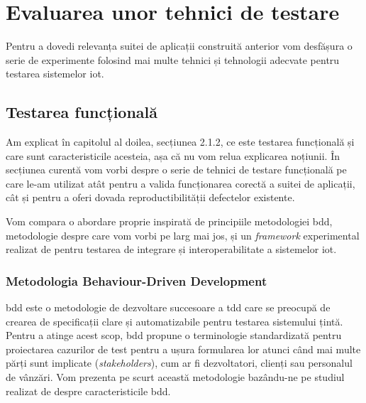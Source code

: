 \chapter{Evaluarea unor tehnici de testare}

Pentru a dovedi relevanța suitei de aplicații construită anterior vom desfășura o serie de experimente folosind mai multe tehnici și tehnologii adecvate pentru testarea sistemelor \acrshort{iot}. 



\section{Testarea funcțională}

Am explicat în capitolul al doilea, secțiunea 2.1.2, ce este testarea funcțională și care sunt caracteristicile acesteia, așa că nu vom relua explicarea noțiunii. În secțiunea curentă vom vorbi despre o serie de tehnici de testare funcțională pe care le-am utilizat atât pentru a valida funcționarea corectă a suitei de aplicații, cât și pentru a oferi dovada reproductibilității defectelor existente.

Vom compara o abordare proprie inspirată de principiile metodologiei \acrfull{bdd}, metodologie despre care vom vorbi pe larg mai jos, și un \textit{framework} experimental realizat de \cite{Bures2021} pentru testarea de integrare și interoperabilitate a sistemelor \acrshort{iot}.

\subsection{Metodologia Behaviour-Driven Development}


\acrfull{bdd} este o metodologie de dezvoltare succesoare a \acrfull{tdd} care se preocupă de crearea de specificații clare și automatizabile pentru testarea sistemului țintă. Pentru a atinge acest scop, \acrshort{bdd} propune o terminologie standardizată pentru proiectarea cazurilor de test pentru a ușura formularea lor atunci când mai multe părți sunt implicate (\textit{stakeholders}), cum ar fi dezvoltatori, clienți sau personalul de vânzări. Vom prezenta pe scurt această metodologie bazându-ne pe studiul realizat de \cite{Solis2011} despre caracteristicile \acrshort{bdd}.

